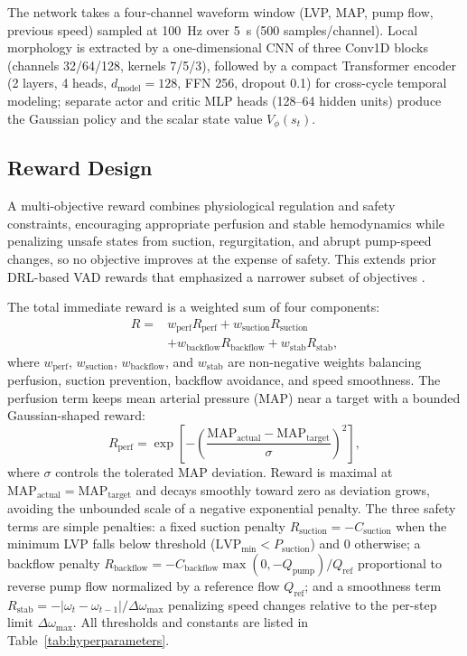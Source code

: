 \documentclass[sigconf]{acmart}
\begin{document}
The network takes a four-channel waveform window (LVP, MAP, pump flow, previous speed) sampled at 100~Hz over 5~s (500 samples/channel). Local morphology is extracted by a one-dimensional CNN of three Conv1D blocks (channels 32/64/128, kernels 7/5/3), followed by a compact Transformer encoder (2 layers, 4 heads, $d_{\mathrm{model}}=128$, FFN 256, dropout 0.1) for cross-cycle temporal modeling; separate actor and critic MLP heads (128--64 hidden units) produce the Gaussian policy and the scalar state value $V_\phi(s_t)$.

\subsection{Reward Design}
A multi-objective reward combines physiological regulation and safety constraints, encouraging appropriate perfusion and stable hemodynamics while penalizing unsafe states from suction, regurgitation, and abrupt pump-speed changes, so no objective improves at the expense of safety. This extends prior DRL-based VAD rewards that emphasized a narrower subset of objectives \cite{b10,b11,b12}.

The total immediate reward is a weighted sum of four components:
\begin{equation}
\begin{aligned}
R ={}& w_{\mathrm{perf}} R_{\mathrm{perf}}
+ w_{\mathrm{suction}} R_{\mathrm{suction}} \\
&+ w_{\mathrm{backflow}} R_{\mathrm{backflow}}
+ w_{\mathrm{stab}} R_{\mathrm{stab}},
\end{aligned}
\label{eq:total_reward}
\end{equation}
where $w_{\mathrm{perf}}$, $w_{\mathrm{suction}}$, $w_{\mathrm{backflow}}$, and $w_{\mathrm{stab}}$ are non-negative weights balancing perfusion, suction prevention, backflow avoidance, and speed smoothness. The perfusion term keeps mean arterial pressure (MAP) near a target with a bounded Gaussian-shaped reward:
\begin{equation}
R_{\mathrm{perf}} =
\exp\left[
-\left(
\frac{\mathrm{MAP}_{\mathrm{actual}} - \mathrm{MAP}_{\mathrm{target}}}
{\sigma}
\right)^2
\right],
\label{eq:perfusion_reward}
\end{equation}
where $\sigma$ controls the tolerated MAP deviation. Reward is maximal at $\mathrm{MAP}_{\mathrm{actual}}=\mathrm{MAP}_{\mathrm{target}}$ and decays smoothly toward zero as deviation grows, avoiding the unbounded scale of a negative exponential penalty. The three safety terms are simple penalties: a fixed suction penalty $R_{\mathrm{suction}}=-C_{\mathrm{suction}}$ when the minimum LVP falls below threshold ($\mathrm{LVP}_{\min}<P_{\mathrm{suction}}$) and $0$ otherwise; a backflow penalty $R_{\mathrm{backflow}}=-C_{\mathrm{backflow}}\max(0,-Q_{\mathrm{pump}})/Q_{\mathrm{ref}}$ proportional to reverse pump flow normalized by a reference flow $Q_{\mathrm{ref}}$; and a smoothness term $R_{\mathrm{stab}}=-|\omega_t-\omega_{t-1}|/\Delta\omega_{\max}$ penalizing speed changes relative to the per-step limit $\Delta\omega_{\max}$. All thresholds and constants are listed in Table~\ref{tab:hyperparameters}.
\end{document}
